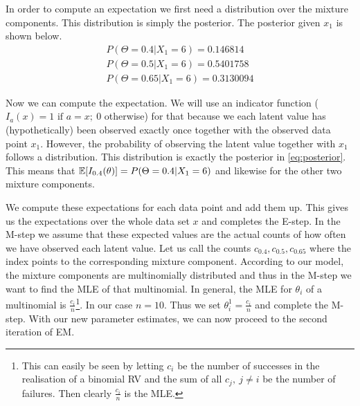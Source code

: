 In order to compute an expectation we first need a distribution over the mixture components. This distribution is simply the posterior. The
posterior given $ x_{1} $ is shown below.
\begin{align}\label{eq:posterior}
P(\Theta=0.4|X_{1}=6) = 0.146814 \\
P(\Theta=0.5|X_{1}=6) = 0.5401758 \nonumber \\
P(\Theta=0.65|X_{1}=6) = 0.3130094 \nonumber
\end{align}

Now we can compute the expectation. We will use an indicator function ($ I_{a}(x) = 1 \mbox{ if } a=x;~0 $ otherwise) 
for that because we each latent value has (hypothetically) been observed exactly once
together with the observed data point $ x_{1} $. However, the probability of observing the latent value together with $ x_{1} $ follows a distribution.
This distribution is exactly the posterior in \eqref{eq:posterior}. This means that $ \mathbb{E}[I_{0.4}(\theta)] = P(\Theta=0.4|X_{1}=6) $ and likewise for the
other two mixture components.

We compute these expectations for each data point and add them up. This gives us the expectations over the whole data set $ x $ and completes the E-step.
In the M-step we assume that these expected values are the actual counts of how often we have observed each latent value. Let us call the counts 
$ c_{0.4}, c_{0.5}, c_{0.65} $ where the index points to the corresponding mixture component. According to our model, the mixture components are multinomially
distributed and thus in the M-step we want to find the MLE of that multinomial. In general, the MLE for $ \theta_{i} $ of a multinomial is
$ \frac{c_{i}}{n} $\footnote{This can easily be seen by letting $ c_{i} $ be the number of successes in the realisation of a binomial RV and the sum of all
$ c_{j},~j \not = i $ be the number of failures. Then clearly $ \frac{c_{i}}{n} $ is the MLE.}. In our case $ n=10 $. Thus we set 
$ \theta_{i}^{1} = \frac{c_{i}}{n} $ and complete the M-step. With our new parameter estimates, we can now proceed to the second iteration of EM. \bigskip

%


